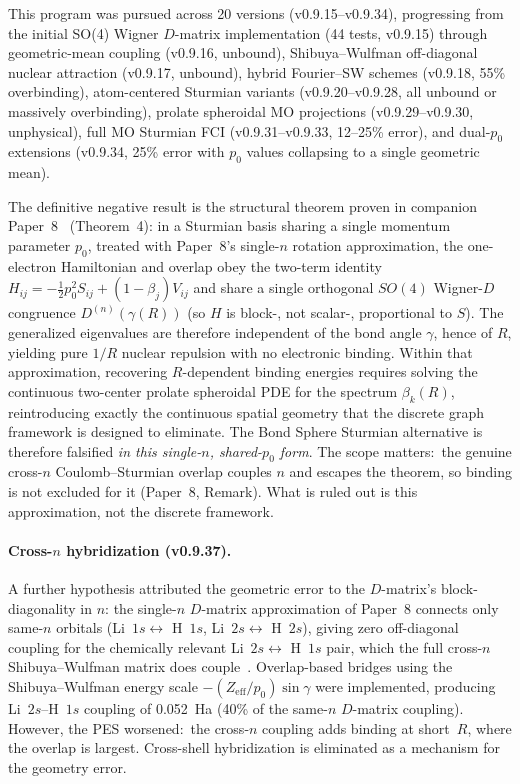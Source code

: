 \documentclass[aps,pra,twocolumn,superscriptaddress,longbibliography]{revtex4-2}
\begin{document}
This program was pursued across 20 versions (v0.9.15--v0.9.34),
progressing from the initial SO(4) Wigner $D$-matrix implementation (44
tests, v0.9.15) through geometric-mean coupling (v0.9.16, unbound),
Shibuya--Wulfman off-diagonal nuclear attraction (v0.9.17, unbound),
hybrid Fourier--SW schemes (v0.9.18, 55\% overbinding), atom-centered
Sturmian variants (v0.9.20--v0.9.28, all unbound or massively
overbinding), prolate spheroidal MO projections
(v0.9.29--v0.9.30, unphysical), full MO Sturmian FCI
(v0.9.31--v0.9.33, 12--25\% error), and dual-$p_0$ extensions (v0.9.34,
25\% error with $p_0$ values collapsing to a single geometric mean).

The definitive negative result is the structural theorem proven in
companion Paper~8~\cite{paper8} (Theorem~4): in a Sturmian basis
sharing a single momentum parameter $p_0$, treated with Paper~8's
single-$n$ rotation approximation, the one-electron Hamiltonian
and overlap obey the two-term identity
$H_{ij} = -\tfrac12 p_0^2 S_{ij} + (1-\beta_j)V_{ij}$ and share a single
orthogonal $SO(4)$ Wigner-$D$ congruence $D^{(n)}(\gamma(R))$ (so $H$ is
block-, not scalar-, proportional to $S$).  The generalized eigenvalues
are therefore independent of the bond angle $\gamma$, hence of $R$,
yielding pure $1/R$ nuclear repulsion with no electronic binding.  Within that
approximation, recovering $R$-dependent binding energies requires solving the continuous
two-center prolate spheroidal PDE for the spectrum $\beta_k(R)$,
reintroducing exactly the continuous spatial geometry that the discrete
graph framework is designed to eliminate.  The Bond Sphere Sturmian
alternative is therefore falsified \emph{in this single-$n$, shared-$p_0$
form}.  The scope matters:\ the genuine cross-$n$ Coulomb--Sturmian overlap
couples $n$ and escapes the theorem, so binding is not excluded for it
(Paper~8, Remark).  What is
ruled out is this approximation, not the discrete framework.

\paragraph{Cross-$n$ hybridization (v0.9.37).}
A further hypothesis attributed the geometric error to the $D$-matrix's
block-diagonality in $n$: the single-$n$ $D$-matrix approximation of
Paper~8 connects only same-$n$ orbitals (Li~$1s \leftrightarrow$ H~$1s$,
Li~$2s \leftrightarrow$ H~$2s$), giving zero off-diagonal coupling for
the chemically relevant Li~$2s \leftrightarrow$ H~$1s$ pair, which the
full cross-$n$ Shibuya--Wulfman matrix does couple~\cite{paper8}.  Overlap-based bridges using the
Shibuya--Wulfman energy scale $-(Z_{\mathrm{eff}}/p_0)\sin\gamma$ were
implemented, producing Li~$2s$--H~$1s$ coupling of 0.052~Ha (40\% of
the same-$n$ $D$-matrix coupling).  However, the PES worsened:\ the
cross-$n$ coupling adds binding at short~$R$, where the overlap is
largest.  Cross-shell hybridization is eliminated as a
mechanism for the geometry error.
\end{document}
